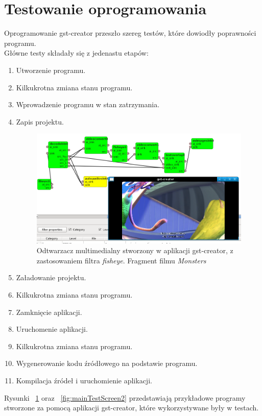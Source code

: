 \documentclass[12pt]{article}
\begin{document}
\section{Testowanie oprogramowania}
Oprogramowanie gst-creator przeszło szereg testów, które dowiodły poprawności programu.\\
Główne testy składały się z jedenastu etapów:
\begin{enumerate}
  \setlength{\itemsep}{0em}
\item Utworzenie programu.
\item Kilkukrotna zmiana stanu programu.
\item Wprowadzenie programu w stan zatrzymania.
\item Zapis projektu.
\begin{figure}[H]
  \includegraphics[width=160mm]{img/main-test-screen1.png}
  \caption{Odtwarzacz multimedialny stworzony w aplikacji gst-creator, z zastosowaniem filtra \textit{fisheye}. Fragment filmu \textit{Monsters} \cite{monstersDownloadPage}}
  \label{fig:mainTestScreen1}
\end{figure}
\item Załadowanie projektu. 
\item Kilkukrotna zmiana stanu programu.
\item Zamknięcie aplikacji.
\item Uruchomenie aplikacji.
\item Kilkukrotna zmiana stanu programu.
\item Wygenerowanie kodu źródłowego na podstawie programu.
\item Kompilacja źródeł i uruchomienie aplikacji.
\end{enumerate}
Rysunki ~\ref{fig:mainTestScreen1} oraz ~\ref{fig:mainTestScreen2} przedstawiają przykładowe programy stworzone za pomocą aplikacji gst-creator, które wykorzystywane były w testach.
\end{document}
